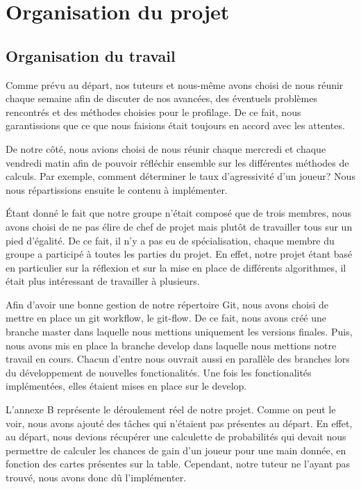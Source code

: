 \documentclass{report}
\begin{document}
\chapter{Organisation du projet}



\section{Organisation du travail}
\hspace{0.5cm}Comme prévu au départ, nos tuteurs et nous-même avons choisi de nous réunir chaque semaine afin de discuter de nos avancées, des éventuels problèmes rencontrés et des méthodes choisies pour le profilage. De ce fait, nous garantissions que ce que nous faisions était toujours en accord avec les attentes.\par
De notre côté, nous avions choisi de nous réunir chaque mercredi et chaque vendredi matin afin de pouvoir réfléchir ensemble sur les différentes méthodes de calculs. Par exemple, comment déterminer le taux d'agressivité d'un joueur? Nous nous répartissions ensuite le contenu à implémenter.\par
Étant donné le fait que notre groupe n'était composé que de trois membres, nous avons choisi de ne pas élire de chef de projet mais plutôt de travailler tous sur un pied d'égalité. De ce fait, il n'y a pas eu de spécialisation, chaque membre du groupe a participé à toutes les parties du projet. En effet, notre projet étant basé en particulier sur la réflexion et sur la mise en place de différents algorithmes, il était plus intéressant de travailler à plusieurs.\par
Afin d'avoir une bonne gestion de notre répertoire Git, nous avons choisi de mettre en place un git workflow, le git-flow. De ce fait, nous avons créé une branche master dans laquelle nous mettions uniquement les versions finales. Puis, nous avons mis en place la branche develop dans laquelle nous mettions notre travail en cours. Chacun d'entre nous ouvrait aussi en parallèle des branches lors du développement de nouvelles fonctionalités. Une fois les fonctionalités implémentées, elles étaient mises en place sur le develop. \par


L'annexe B représente le déroulement réel de notre projet. Comme on peut le voir, nous avons ajouté des tâches qui n'étaient pas présentes au départ. En effet, au départ, nous devions récupérer une calculette de probabilités qui devait nous permettre de calculer les chances de gain d'un joueur pour une main donnée, en fonction des cartes présentes sur la table. Cependant, notre tuteur ne l'ayant pas trouvé, nous avons donc dû l'implémenter. 
\end{document}
